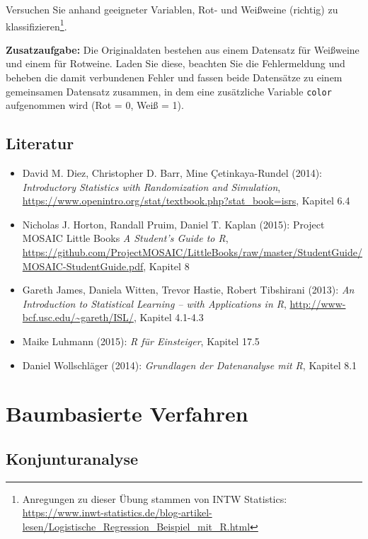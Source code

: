 \documentclass[12pt,]{book}
\providecommand{\tightlist}{%
  \setlength{\itemsep}{0pt}\setlength{\parskip}{0pt}}
\let\rmarkdownfootnote\footnote%
\def\footnote{\protect\rmarkdownfootnote}
\begin{document}
Versuchen Sie anhand geeigneter Variablen, Rot- und Weißweine (richtig)
zu klassifizieren\footnote{Anregungen zu dieser Übung stammen von INTW
  Statistics:
  \url{https://www.inwt-statistics.de/blog-artikel-lesen/Logistische_Regression_Beispiel_mit_R.html}}.

\textbf{Zusatzaufgabe:} Die Originaldaten bestehen aus einem Datensatz
für Weißweine und einem für Rotweine. Laden Sie diese, beachten Sie die
Fehlermeldung und beheben die damit verbundenen Fehler und fassen beide
Datensätze zu einem gemeinsamen Datensatz zusammen, in dem eine
zusätzliche Variable \texttt{color} aufgenommen wird (Rot = 0, Weiß =
1).

\section{Literatur}\label{literatur-1}

\begin{itemize}
\tightlist
\item
  David M. Diez, Christopher D. Barr, Mine Çetinkaya-Rundel (2014):
  \emph{Introductory Statistics with Randomization and Simulation},
  \url{https://www.openintro.org/stat/textbook.php?stat_book=isrs},
  Kapitel 6.4
\item
  Nicholas J. Horton, Randall Pruim, Daniel T. Kaplan (2015): Project
  MOSAIC Little Books \emph{A Student's Guide to R},
  \url{https://github.com/ProjectMOSAIC/LittleBooks/raw/master/StudentGuide/MOSAIC-StudentGuide.pdf},
  Kapitel 8
\item
  Gareth James, Daniela Witten, Trevor Hastie, Robert Tibshirani (2013):
  \emph{An Introduction to Statistical Learning -- with Applications in
  R}, \url{http://www-bcf.usc.edu/~gareth/ISL/}, Kapitel 4.1-4.3
\item
  Maike Luhmann (2015): \emph{R für Einsteiger}, Kapitel 17.5
\item
  Daniel Wollschläger (2014): \emph{Grundlagen der Datenanalyse mit R},
  Kapitel 8.1
\end{itemize}

\chapter{Baumbasierte Verfahren}\label{baumbasierte-verfahren}

\section{Konjunturanalyse}\label{konjunturanalyse}
\end{document}
